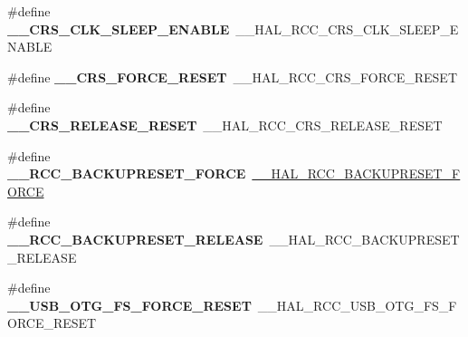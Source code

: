 \begin{DoxyCompactItemize}
\item 
\mbox{\label{group___h_a_l___r_c_c___aliased_ga021f37b26826b71eb190799dca3c9c8e}} 
\#define {\bfseries \+\_\+\+\_\+\+C\+R\+S\+\_\+\+C\+L\+K\+\_\+\+S\+L\+E\+E\+P\+\_\+\+E\+N\+A\+B\+LE}~\+\_\+\+\_\+\+H\+A\+L\+\_\+\+R\+C\+C\+\_\+\+C\+R\+S\+\_\+\+C\+L\+K\+\_\+\+S\+L\+E\+E\+P\+\_\+\+E\+N\+A\+B\+LE
\item 
\mbox{\label{group___h_a_l___r_c_c___aliased_ga9e67e2882448dc0477a13ff77b08ae93}} 
\#define {\bfseries \+\_\+\+\_\+\+C\+R\+S\+\_\+\+F\+O\+R\+C\+E\+\_\+\+R\+E\+S\+ET}~\+\_\+\+\_\+\+H\+A\+L\+\_\+\+R\+C\+C\+\_\+\+C\+R\+S\+\_\+\+F\+O\+R\+C\+E\+\_\+\+R\+E\+S\+ET
\item 
\mbox{\label{group___h_a_l___r_c_c___aliased_gaee653fe1285dc71584a287f1752deef6}} 
\#define {\bfseries \+\_\+\+\_\+\+C\+R\+S\+\_\+\+R\+E\+L\+E\+A\+S\+E\+\_\+\+R\+E\+S\+ET}~\+\_\+\+\_\+\+H\+A\+L\+\_\+\+R\+C\+C\+\_\+\+C\+R\+S\+\_\+\+R\+E\+L\+E\+A\+S\+E\+\_\+\+R\+E\+S\+ET
\item 
\mbox{\label{group___h_a_l___r_c_c___aliased_ga717fc2d87d7b55be19d505a1c55507c5}} 
\#define {\bfseries \+\_\+\+\_\+\+R\+C\+C\+\_\+\+B\+A\+C\+K\+U\+P\+R\+E\+S\+E\+T\+\_\+\+F\+O\+R\+CE}~\mbox{\hyperlink{group___r_c_c___internal___r_t_c___clock___configuration_ga3bf7da608ff985873ca8e248fb1dc4f0}{\+\_\+\+\_\+\+H\+A\+L\+\_\+\+R\+C\+C\+\_\+\+B\+A\+C\+K\+U\+P\+R\+E\+S\+E\+T\+\_\+\+F\+O\+R\+CE}}
\item 
\mbox{\label{group___h_a_l___r_c_c___aliased_ga16e2165e9541a9ffbf34614eb6ef91c2}} 
\#define {\bfseries \+\_\+\+\_\+\+R\+C\+C\+\_\+\+B\+A\+C\+K\+U\+P\+R\+E\+S\+E\+T\+\_\+\+R\+E\+L\+E\+A\+SE}~\+\_\+\+\_\+\+H\+A\+L\+\_\+\+R\+C\+C\+\_\+\+B\+A\+C\+K\+U\+P\+R\+E\+S\+E\+T\+\_\+\+R\+E\+L\+E\+A\+SE
\item 
\mbox{\label{group___h_a_l___r_c_c___aliased_ga4cbf3d0cd9c1f29b7f38cd672a7f81a3}} 
\#define {\bfseries \+\_\+\+\_\+\+U\+S\+B\+\_\+\+O\+T\+G\+\_\+\+F\+S\+\_\+\+F\+O\+R\+C\+E\+\_\+\+R\+E\+S\+ET}~\+\_\+\+\_\+\+H\+A\+L\+\_\+\+R\+C\+C\+\_\+\+U\+S\+B\+\_\+\+O\+T\+G\+\_\+\+F\+S\+\_\+\+F\+O\+R\+C\+E\+\_\+\+R\+E\+S\+ET
\item 

\end{DoxyCompactItemize}
